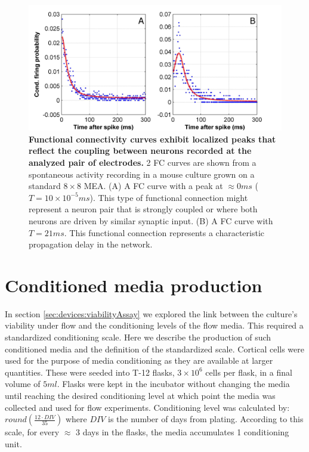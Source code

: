 \begin{figure}[h]
\centering
\includegraphics[width=15cm]{chapter2/figures/FCDemonstration/FCDemonstration.jpg}
\caption[Examples of functional connectivity curves]{\textbf{Functional connectivity curves exhibit localized peaks that reflect the coupling between neurons recorded at the analyzed pair of electrodes.} 2 FC curves are shown from a spontaneous activity recording in a mouse culture grown on a standard \(8\times 8\) MEA. (A) A FC curve with a peak at \(\approx 0ms\) (\(T=10\times 10^{-5}ms\)). This type of functional connection might represent a neuron pair that is strongly coupled or where both neurons are driven by similar synaptic input. (B) A FC curve with \(T=21ms\). This functional connection represents a characteristic propagation delay in the network.}

\label{fig:methods:FC}
\end{figure}
\label{sec:methods:FC}

\section{Conditioned media production}
In section \ref{sec:devices:viabilityAssay} we explored the link between the culture's viability under flow and the conditioning levels of the flow media. This required a standardized conditioning scale. Here we describe the production of such conditioned media and the definition of the standardized scale. Cortical cells were used for the purpose of media conditioning as they are available at larger quantities. These were seeded into T-12 flasks, \(3\times 10^6\) cells per flask, in a final volume of \(5 ml\). Flasks were kept in the incubator without changing the media until reaching the desired conditioning level at which point the media was collected and used for flow experiments. Conditioning level was calculated by: \(round\left(\frac{12\cdot DIV}{35}\right)\) where \(DIV\) is the number of days from plating. According to this scale, for every \(\approx\) 3 days in the flasks, the media accumulates 1 conditioning unit.
    \label{sec:methods:cond}



